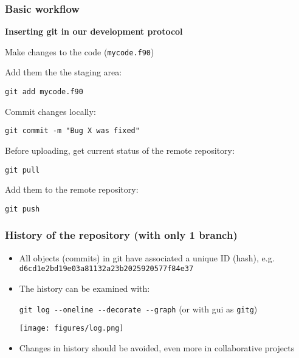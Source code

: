 \documentclass[xcolor=dvipsnames,10pt]{beamer}
\begin{document}
\begin{frame}
 \frametitle{Basic workflow}
 
 \textbf{Inserting git in our development protocol} 
 \vspace*{0.5cm}
 
 \begin{enumerate}
  \item Make changes to the code (\texttt{mycode.f90})
  \vspace*{0.2cm}
  
  \item Add them the the staging area: 
  
  \texttt{git add mycode.f90} 
  \vspace*{0.2cm}
  
  \item Commit changes locally:
  
  \texttt{git commit -m "Bug X was fixed"}
  \vspace*{0.2cm}
  
  {
  \color{blue}
  \item[*] Before uploading, get current status of the remote repository:
  
  \texttt{git pull}
  }
  \vspace*{0.2cm}
  
  
  \item Add them to the remote repository:
  
  \texttt{git push}
 \end{enumerate}

\end{frame}



\begin{frame}
 \frametitle{History of the repository (with only 1 branch)}
 
 \begin{itemize}
  \item All objects (commits) in git have associated a unique ID (hash), e.g. \texttt{d6cd1e2bd19e03a81132a23b2025920577f84e37}
  \vspace*{0.2cm}
  
  \item The history can be examined with:

  \texttt{git log -{}-oneline -{}-decorate -{}-graph} (or with gui as \texttt{gitg}) 
  \begin{center}
   \texttt{[image: figures/log.png]}
  \end{center}
    \vspace*{0.2cm}

   \item Changes in history should be avoided, even more in collaborative projects
  
 \end{itemize}

 
\end{frame}
\end{document}
